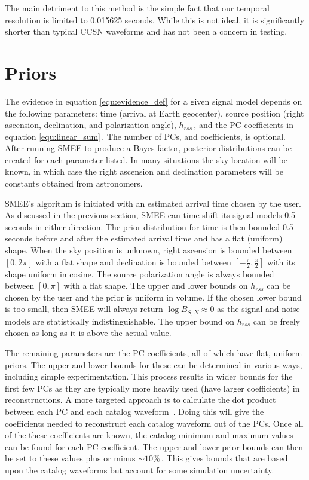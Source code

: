 The main detriment to this method is the simple fact that our temporal resolution is limited to 0.015625 seconds. While this is not ideal, it is significantly shorter than typical CCSN waveforms and has not been a concern in testing.

\section{Priors}
\label{sec:priors}

The evidence in equation \ref{equ:evidence_def} for a given signal model depends on the following parameters: time (arrival at Earth geocenter), source position (right ascension, declination, and polarization angle), $h_{rss}$\,, and the PC coefficients in equation \ref{equ:linear_sum}\,. The number of PCs, and coefficients, is optional. After running SMEE to produce a Bayes factor, posterior distributions can be created for each parameter listed. In many situations the sky location will be known, in which case the right ascension and declination parameters will be constants obtained from astronomers.

SMEE's algorithm is initiated with an estimated arrival time chosen by the user. As discussed in the previous section, SMEE can time-shift its signal models 0.5 seconds in either direction. The prior distribution for time is then bounded 0.5 seconds before and after the estimated arrival time and has a flat (uniform) shape. When the sky position is unknown, right ascension is bounded between $[0, 2\pi]$ with a flat shape and declination is bounded between $[-\frac{\pi}{2}, \frac{\pi}{2}]$ with its shape uniform in cosine. The source polarization angle is always bounded between $[0, \pi]$ with a flat shape. The upper and lower bounds on $h_{rss}$ can be chosen by the user and the prior is uniform in volume. If the chosen lower bound is too small, then SMEE will always return $\log B_{S,N} \approx 0$ as the signal and noise models are statistically indistinguishable. The upper bound on $h_{rss}$ can be freely chosen as long as it is above the actual value.

The remaining parameters are the PC coefficients, all of which have flat, uniform priors. The upper and lower bounds for these can be determined in various ways, including simple experimentation. This process results in wider bounds for the first few PCs as they are typically more heavily used (have larger coefficients) in reconstructions. A more targeted approach is to calculate the dot product between each PC and each catalog waveform~\cite{thesis_josh, thesis_jade, heng:09}. Doing this will give the coefficients needed to reconstruct each catalog waveform out of the PCs. Once all of the these coefficients are known, the catalog minimum and maximum values can be found for each PC coefficient. The upper and lower prior bounds can then be set to these values plus or minus $\sim 10\%$\,. This gives bounds that are based upon the catalog waveforms but account for some simulation uncertainty.

